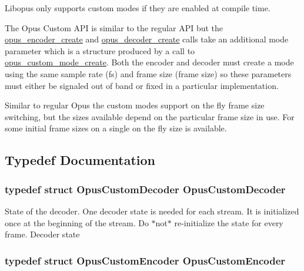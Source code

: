 Libopus only supports custom modes if they are enabled at compile time.

The Opus Custom API is similar to the regular API but the \hyperlink{group__opus__encoder_gaa89264fd93c9da70362a0c9b96b9ca88}{opus\_\-encoder\_\-create} and \hyperlink{group__opus__decoder_ga753f6fe0b699c81cfd47d70c8e15a0bd}{opus\_\-decoder\_\-create} calls take an additional mode parameter which is a structure produced by a call to \hyperlink{group__opus__custom_ga8d6683d0b9f2990a8f54d8bafe4f4027}{opus\_\-custom\_\-mode\_\-create}. Both the encoder and decoder must create a mode using the same sample rate (fs) and frame size (frame size) so these parameters must either be signaled out of band or fixed in a particular implementation.

Similar to regular Opus the custom modes support on the fly frame size switching, but the sizes available depend on the particular frame size in use. For some initial frame sizes on a single on the fly size is available. 

\subsection{Typedef Documentation}
\hypertarget{group__opus__custom_gacae60f89c5ce7aeea69503451b9e2e6f}{
\subsubsection[{OpusCustomDecoder}]{\setlength{\rightskip}{0pt plus 5cm}typedef struct {\bf OpusCustomDecoder} {\bf OpusCustomDecoder}}}
\label{group__opus__custom_gacae60f89c5ce7aeea69503451b9e2e6f}


State of the decoder. One decoder state is needed for each stream. It is initialized once at the beginning of the stream. Do $\ast$not$\ast$ re-\/initialize the state for every frame. Decoder state \hypertarget{group__opus__custom_ga7abe6a7afc599667950251c987feb439}{
\subsubsection[{OpusCustomEncoder}]{\setlength{\rightskip}{0pt plus 5cm}typedef struct {\bf OpusCustomEncoder} {\bf OpusCustomEncoder}}}
\label{group__opus__custom_ga7abe6a7afc599667950251c987feb439}


